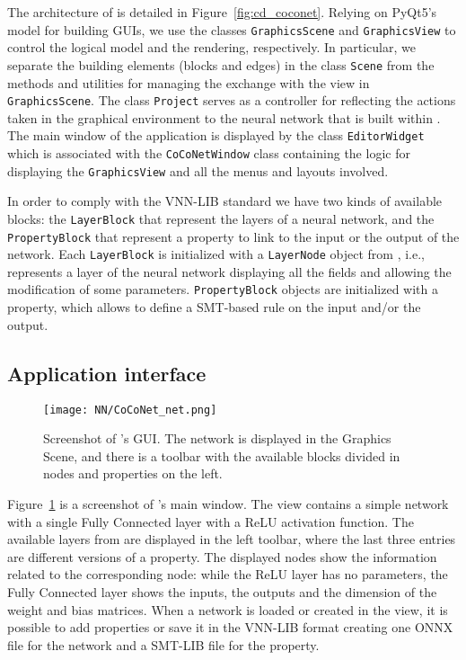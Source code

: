 The architecture of \coconet{} is detailed in Figure~\ref{fig:cd_coconet}. Relying
on PyQt5's model for building GUIs, we use the classes \texttt{GraphicsScene} and
\texttt{GraphicsView} to control the logical model and the rendering, respectively.
In particular, we separate the building elements (blocks and edges) in the class
\texttt{Scene} from the methods and utilities for managing the exchange with the
view in \texttt{GraphicsScene}. The class \texttt{Project} serves as a
controller for reflecting the actions taken in the graphical environment to the
neural network that is built within \pynever. The main window of the application is 
displayed by the class \texttt{EditorWidget} which is associated with the 
\texttt{CoCoNetWindow} class containing the logic for displaying the 
\texttt{GraphicsView} and all the menus and layouts involved.

In order to comply with the VNN-LIB standard we have two kinds of available blocks:
the \texttt{LayerBlock} that represent the layers of a neural network, and the
\texttt{PropertyBlock} that represent a property to link to the input or the output
of the network. Each \texttt{LayerBlock} is initialized with a \texttt{LayerNode}
object from \pynever, i.e., represents a layer of the neural network displaying
all the fields and allowing the modification of some parameters. \texttt{PropertyBlock}
objects are initialized with a \pynever{} property, which allows to define a SMT-based
rule on the input and/or the output.

\subsection{Application interface}

\begin{figure}[t]
	\caption{\label{fig:coconet_gui} Screenshot of \coconet's GUI. The network
		is displayed in the Graphics Scene, and there is a toolbar with the 
		available blocks divided in nodes and properties on the left.}
	\centering
	\texttt{[image: NN/CoCoNet\_net.png]}
\end{figure}

Figure~\ref{fig:coconet_gui} is a screenshot of \coconet's main window. The
view contains a simple network with a single Fully Connected layer with a ReLU
activation function. The available layers from \pynever{} are displayed in the
left toolbar, where the last three entries are different versions of a property.
The displayed nodes show the information related to the corresponding node: while
the ReLU layer has no parameters, the Fully Connected layer shows the inputs, the
outputs and the dimension of the weight and bias matrices. When a network is loaded
or created in the view, it is possible to add properties or save it in the VNN-LIB
format creating one ONNX file for the network and a SMT-LIB file for the property.

